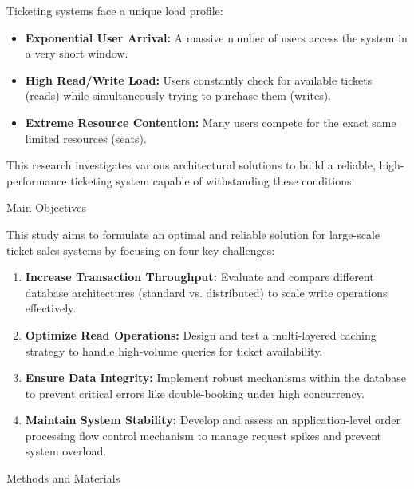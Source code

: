 \documentclass[a0,landscape]{config/poster/a0poster}
\newcommand{\postersection}[1]{%
  \begin{tcolorbox}[
    colback=IEEEblue,
    colframe=IEEEblue,
    fonttitle=\bfseries,
    coltext=white,
    sharp corners,
    boxrule=0pt,
    top=4pt,
    bottom=4pt,
    halign=center
  ]
    \large #1
  \end{tcolorbox}%
}
\begin{document}
\begin{multicols}{4}
    Ticketing systems face a unique load profile:
    \begin{itemize}
        \item \textbf{Exponential User Arrival:} A massive number of users access the system in a very short window.
        \item \textbf{High Read/Write Load:} Users constantly check for available tickets (reads) while simultaneously trying to purchase them (writes).
        \item \textbf{Extreme Resource Contention:} Many users compete for the exact same limited resources (seats).
    \end{itemize}
    This research investigates various architectural solutions to build a reliable, high-performance ticketing system capable of withstanding these conditions.


    \postersection{Main Objectives}
    This study aims to formulate an optimal and reliable solution for large-scale ticket sales systems by focusing on four key challenges:
    \begin{enumerate}
        \item \textbf{Increase Transaction Throughput:} Evaluate and compare different database architectures (standard vs. distributed) to scale write operations effectively.
        \item \textbf{Optimize Read Operations:} Design and test a multi-layered caching strategy to handle high-volume queries for ticket availability.
        \item \textbf{Ensure Data Integrity:} Implement robust mechanisms within the database to prevent critical errors like double-booking under high concurrency.
        \item \textbf{Maintain System Stability:} Develop and assess an application-level order processing flow control mechanism to manage request spikes and prevent system overload.
    \end{enumerate}


    \postersection{Methods and Materials}

\end{multicols}
\end{document}
